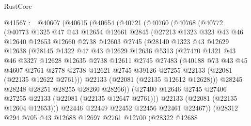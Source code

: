 \begin{lexlean}{RustCore}
\begin{coremodule}
@41567 := @40607
    (@40615
      (@40654
        (@40721
          (@40760
            (@40768
              (@40772
                (@40773
                  @1325
                  @47
                  @43
                  @12654
                  @12661
                  @2845
                  (@27213
                    @1323
                    @323
                    @43
                    @46
                    @12640
                    @12653
                    @12660
                    @2738
                    @12603
                    @2745
                    (@28140
                      @1323
                      @43
                      @12629
                      @12638
                      (@28145
                        @1322
                        @47
                        @43
                        @12629
                        @12636
                        @5313
                        (@27470
                          @1321
                          @43
                          @46
                          @3327
                          @12628
                          @12635
                          @2738
                          @12611
                          @2745
                          @27483
                          (@40188
                            @73
                            @43
                            @45
                            @4607
                            @2761
                            @2778
                            @2738
                            @12621
                            @2745
                            @39126
                            @27255
                            @22133
                            (@22081 (@22135 @12622 @2761)))
                          @22133
                          (@22081 (@22135 @12612 @12628)))
                        @28245
                        @28248
                        @28251
                        @28255
                        @28260
                        @28266))
                    (@27400 @12646 @2745 @27406 @27255 @22133 (@22081 (@22135 @12647 @2761)))
                    @22133
                    (@22081 (@22135 @12604 @12653)))
                  @22446
                  @22449
                  @22452
                  @22456
                  @22461
                  @22467))
              (@28312
                @294
                @705
                @43
                @12688
                @12697
                @2761
                @12700
                (@28322
                  @12688

\end{coremodule}
\end{lexlean}
